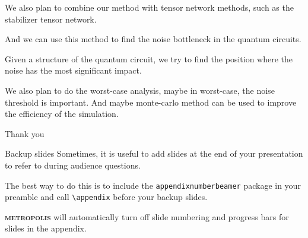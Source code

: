 \documentclass[10pt]{beamer}
\newcommand{\themename}{\textbf{\textsc{metropolis}}\xspace}
\begin{document}
\begin{CJK}{UTF8}{gbsn}
{  We also plan to combine our method with tensor network methods, such as the stabilizer tensor network.

  And we can use this method to find the noise bottleneck in the quantum circuits.

  Given a structure of the quantum circuit, we try to find the position where the noise has the most significant impact.

  We also plan to do the worst-case analysis, maybe in worst-case, the noise threshold is important. And maybe monte-carlo method can be used to improve the efficiency of the simulation. 
}

\begin{frame}[standout]
 Thank you\\
\end{frame}
\appendix

\begin{frame}[fragile]{Backup slides}
 Sometimes, it is useful to add slides at the end of your presentation to
 refer to during audience questions.

 The best way to do this is to include the \verb|appendixnumberbeamer|
 package in your preamble and call \verb|\appendix| before your backup slides.

  \themename will automatically turn off slide numbering and progress bars for
 slides in the appendix.%
\end{frame}



\end{CJK}
\end{document}
